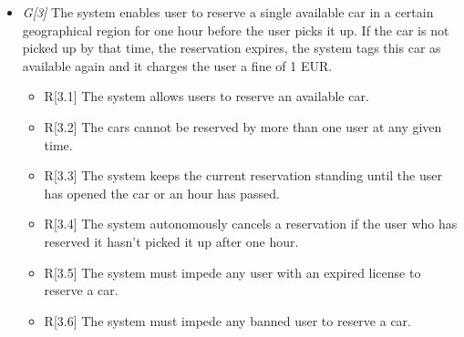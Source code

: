 \begin{itemize}
				\item \textit{G[3]} The system enables user to reserve a single available car in a certain geographical region for one hour before the user picks it up. If the car is not picked up by that time, the reservation expires, the system tags this car as available again and it charges the user a fine of 1 EUR.
					\begin{itemize}
						\item R[3.1] The system allows users to reserve an available car.
						\item R[3.2] The cars cannot be reserved by more than one user at any given time.
						\item R[3.3] The system keeps the current reservation standing until the user has opened the car or an hour has passed.
						\item R[3.4] The system autonomously cancels a reservation if the user who has reserved it hasn't picked it up after one hour.
						
						\item R[3.5] The system must impede any user with an expired license to reserve a car.
						\item R[3.6] The system must impede any banned user to reserve a car.
					\end{itemize}


\end{itemize}
